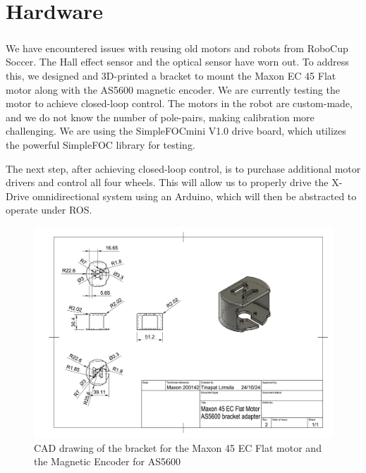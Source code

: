 \chapter{Hardware}

\paragraph*{}
We have encountered issues with reusing old motors and robots from RoboCup Soccer. The Hall effect sensor and the optical sensor have worn out. To address this, we designed and 3D-printed a bracket to mount the Maxon EC 45 Flat motor along with the AS5600 magnetic encoder. We are currently testing the motor to achieve closed-loop control. The motors in the robot are custom-made, and we do not know the number of pole-pairs, making calibration more challenging. We are using the SimpleFOCmini V1.0 drive board, which utilizes the powerful SimpleFOC library for testing.

The next step, after achieving closed-loop control, is to purchase additional motor drivers and control all four wheels. This will allow us to properly drive the X-Drive omnidirectional system using an Arduino, which will then be abstracted to operate under ROS.
\begin{figure}
    \centering
    \includegraphics[width=1\linewidth]{Maxon 45 EC Flat Motor AS5600 bracket adapter Drawing v1.png}
    \caption{CAD drawing of the bracket for the Maxon 45 EC Flat motor and the Magnetic Encoder for AS5600}
    \label{fig:enter-label}
\end{figure}